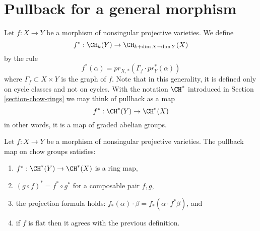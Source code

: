 \section{Pullback for a general morphism}
\label{section-general-pullback}

\noindent
Let $f : X \to Y$ be a morphism of nonsingular projective varieties.
We define
$$
f^* : \CH_k(Y) \to \CH_{k+\dim X - \dim Y}(X)
$$
by the rule
$$
f^*(\alpha) = pr_{X, *}(\Gamma_f \cdot pr_Y^*(\alpha))
$$
where $\Gamma_f \subset X\times Y$ is the graph of $f$. Note that in this
generality, it is defined only on cycle classes and not on cycles. With the
notation $\CH^*$ introduced in Section \ref{section-chow-rings}
we may think of pullback as a map
$$
f^* : \CH^*(Y) \to \CH^*(X)
$$
in other words, it is a map of graded abelian groups.

\begin{lemma}
\label{lemma-pullback-and-intersection-product}
Let $f : X \to Y$ be a morphism of nonsingular projective varieties.
The pullback map on chow groups satisfies:
\begin{enumerate}
\item $f^* : \CH^*(Y) \to \CH^*(X)$ is a ring map,
\item $(g \circ f)^* = f^* \circ g^*$ for a composable pair $f, g$,
\item the projection formula holds: $f_*(\alpha) \cdot \beta =
f_*( \alpha \cdot f^*\beta)$, and
\item if $f$ is flat then it agrees with the previous definition.
\end{enumerate}
\end{lemma}


